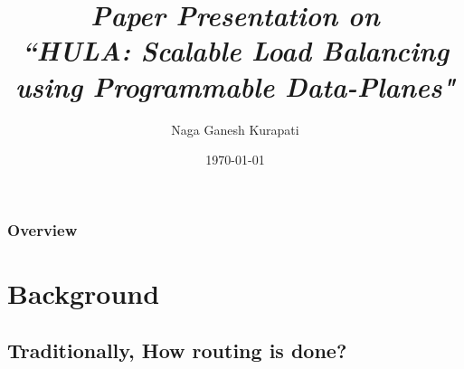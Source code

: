 \documentclass{beamer}
\title[HULA]{\textit{Paper Presentation on}\\ \textit{``HULA: Scalable Load Balancing using Programmable Data-Planes"}} %
\author{Naga Ganesh Kurapati} %
\institute[UMass Lowell] %
{
EECE.7290 Selected Topics on Software Defined Networking \\
\medskip
University of Massachusetts Lowell \\ %
\medskip
\text{Instructor: Prof.Yan Luo} %
}
\date{\today} %
\begin{document}
\begin{frame}
\titlepage %
\end{frame}

\begin{frame}
\frametitle{Overview} %
\tableofcontents %
\end{frame}


\section{Background} %

\subsection{Traditionally, How routing is done?} %
\end{document}
